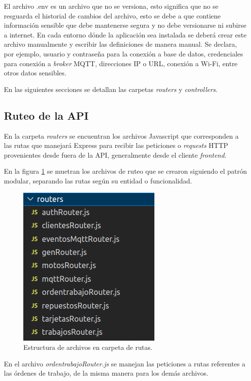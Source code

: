El archivo .env es un archivo que no se versiona, esto significa que no se resguarda el historial de cambios del archivo, esto se debe a que contiene información sensible que debe mantenerse segura y no debe versionarse ni subirse a internet. En cada entorno dónde la aplicación sea instalada se deberá crear este archivo manualmente y escribir las definiciones de manera manual. Se declara, por ejemplo, usuario y contraseña para la conexión a base de datos, credenciales para conexión a \textit{broker} MQTT, direcciones IP o URL, conexión a Wi-Fi, entre otros datos sensibles.

En las siguientes secciones se detallan las carpetas \textit{routers} y \textit{controllers}.

\subsection{Ruteo de la API}
\label{subsec:apirouters}

En la carpeta \textit{routers} se encuentran los archivos Javascript que corresponden a las rutas que manejará Express para recibir las peticiones o \textit{requests} HTTP provenientes desde fuera de la API, generalmente desde el cliente \textit{frontend}.

En la figura \ref{fig:apiroutes} se muetran los archivos de ruteo que se crearon siguiendo el patrón modular, separando las rutas según su entidad o funcionalidad.

\begin{figure}[ht]
	\centering
	\includegraphics[scale=.50]{./Figures/api-routes.png}
	\caption{Estructura de archivos en carpeta de rutas.}
	\label{fig:apiroutes}
\end{figure}

En el archivo \textit{ordentrabajoRouter.js} se manejan las peticiones a rutas referentes a las órdenes de trabajo, de la misma manera para los demás archivos. 

